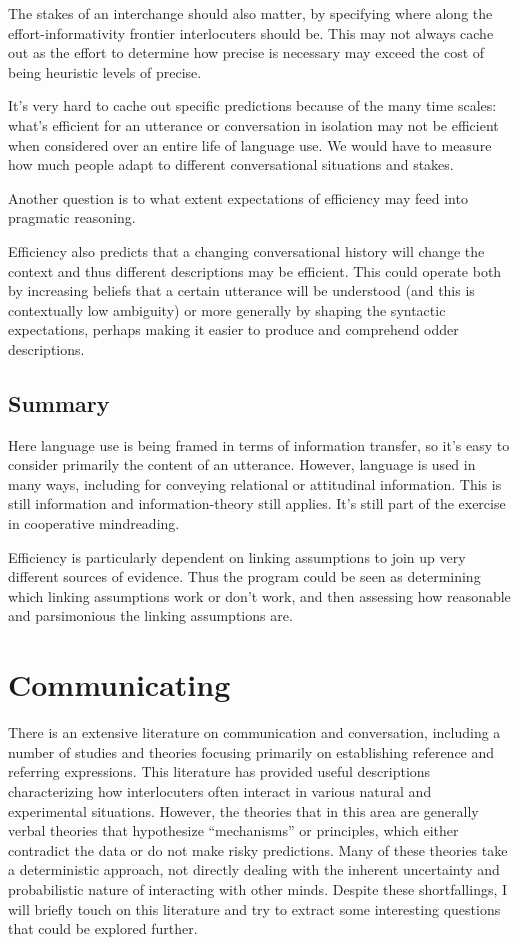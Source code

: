\documentclass[]{article}
\begin{document}
The stakes of an interchange should also matter, by specifying where along the effort-informativity frontier interlocuters should be. This may not always cache out as the effort to determine how precise is necessary may exceed the cost of being heuristic levels of precise. 

It's very hard to cache out specific predictions because of the many time scales: what's efficient for an utterance or conversation in isolation may not be efficient when considered over an entire life of language use. We would have to measure how much people adapt to different conversational situations and stakes. 

Another question is to what extent expectations of efficiency may feed into pragmatic reasoning. %

Efficiency also predicts that a changing conversational history will change the context and thus different descriptions may be efficient. This could operate both by increasing beliefs that a certain utterance will be understood (and this is contextually low ambiguity) or more generally by shaping the syntactic expectations, perhaps making it easier to produce and comprehend odder descriptions. 


\subsection{Summary}
Here language use is being framed in terms of information transfer, so it's easy to consider primarily the content of an utterance. However, language is used in many ways, including for conveying relational or attitudinal information. This is still information and information-theory still applies. It's still part of the exercise in cooperative mindreading. 

Efficiency is particularly dependent on linking assumptions to join up very different sources of evidence. Thus the program could be seen as determining which linking assumptions work or don't work, and then assessing how reasonable and parsimonious the linking assumptions are. 

\section{Communicating}

There is an extensive literature on communication and conversation, including a number of studies and theories focusing primarily on establishing reference and referring expressions. This literature has provided useful descriptions characterizing how interlocuters often interact in various natural and experimental situations. However, the theories that in this area are generally verbal theories that hypothesize ``mechanisms'' or principles, which either contradict the data or do not make risky predictions. Many of these theories take a deterministic approach, not directly dealing with the inherent uncertainty and probabilistic nature of interacting with other minds. Despite these shortfallings, I will briefly touch on this literature and try to extract some interesting questions that could be explored further. 
\end{document}
